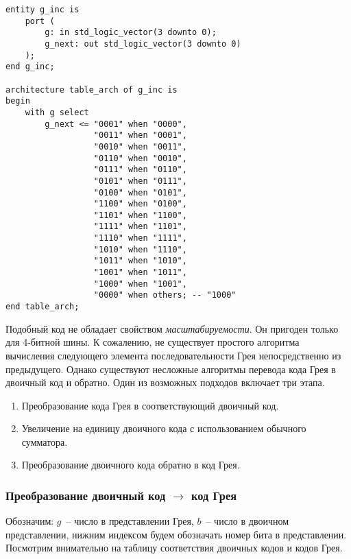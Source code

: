 \begin{Code}
\begin{lstlisting}
entity g_inc is
    port (
        g: in std_logic_vector(3 downto 0);
        g_next: out std_logic_vector(3 downto 0)
    );
end g_inc;

architecture table_arch of g_inc is
begin
    with g select
        g_next <= "0001" when "0000",
                  "0011" when "0001",
                  "0010" when "0011",
                  "0110" when "0010",
                  "0111" when "0110",
                  "0101" when "0111",
                  "0100" when "0101",
                  "1100" when "0100",
                  "1101" when "1100",
                  "1111" when "1101",
                  "1110" when "1111",
                  "1010" when "1110",
                  "1011" when "1010",
                  "1001" when "1011",
                  "1000" when "1001",
                  "0000" when others; -- "1000"
end table_arch;
\end{lstlisting}
\end{Code}

Подобный код не обладает свойством \emph{масштабируемости}. Он пригоден только для 4-битной шины. К сожалению, не существует простого алгоритма вычисления следующего элемента последовательности Грея непосредственно из предыдущего. Однако существуют несложные алгоритмы перевода кода Грея в двоичный код и обратно. Один из возможных подходов включает три этапа.

\begin{enumerate}
\item Преобразование кода Грея в соответствующий двоичный код.
\item Увеличение на единицу двоичного кода с использованием обычного сумматора.
\item Преобразование двоичного кода обратно в код Грея.
\end{enumerate}

\subsubsection{Преобразование двоичный код $\rightarrow$ код Грея}
Обозначим: $g$~-- число в представлении Грея, $b$~-- число в двоичном представлении, нижним индексом будем обозначать номер бита в представлении. Посмотрим внимательно на таблицу соответствия двоичных кодов и кодов Грея.

